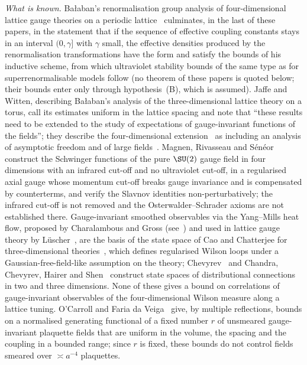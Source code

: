 \emph{What is known.} Ba{\l}aban's renormalisation group analysis of
four-dimensional lattice gauge theories on a periodic
lattice~\cite{Bal84a,Bal85a,Bal85c,Bal87,Bal88,Bal89b} culminates, in the
last of these papers, in the statement that if the sequence of effective
coupling constants stays in an interval $(0,\gamma]$ with $\gamma$ small,
the effective densities produced by the renormalisation transformations
have the form and satisfy the bounds of his inductive scheme, from which
ultraviolet stability bounds of the same type as for superrenormalisable
models follow (no theorem of these papers is quoted below; their bounds enter only
through hypothesis~(B), which is assumed). Jaffe and Witten, describing Ba{\l}aban's analysis of the
three-dimensional lattice theory on a torus, call its estimates uniform in
the lattice spacing and note that ``these results need to be extended to the
study of expectations of gauge-invariant functions of the fields''; they
describe the four-dimensional extension~\cite{Bal87} as including an
analysis of asymptotic freedom and of large fields~\cite{JW06}. Magnen, Rivasseau and
S\'en\'eor~\cite{MRS93} construct the Schwinger functions of the pure
$\SU(2)$ gauge field in four dimensions with an infrared cut-off and no
ultraviolet cut-off, in a regularised axial gauge whose momentum cut-off
breaks gauge invariance and is compensated by counterterms, and verify the
Slavnov identities non-perturbatively; the infrared cut-off is not removed and
the Osterwalder--Schrader axioms are not established there. Gauge-invariant
smoothed observables via the Yang--Mills heat flow, proposed by Charalambous
and Gross (see~\cite{CC24}) and used in lattice gauge theory by
L\"uscher~\cite{Lus10}, are the basis of the state space of Cao and
Chatterjee for three-dimensional theories~\cite{CC24,CC23}, which defines
regularised Wilson loops under a Gaussian-free-field-like assumption on the
theory; Chevyrev~\cite{Che19} and Chandra, Chevyrev, Hairer and
Shen~\cite{CCHS22,CCHS24} construct state spaces of distributional connections
in two and three dimensions. None of these gives a bound on correlations of
gauge-invariant observables of the four-dimensional Wilson measure along a
lattice tuning. O'Carroll and Faria da Veiga~\cite{OCFdV20} give, by multiple
reflections, bounds on a normalised generating functional of a fixed number
$r$ of unsmeared gauge-invariant plaquette fields that are uniform in the
volume, the spacing and the coupling in a bounded range; since $r$ is
fixed, these bounds do not control fields smeared over
$\asymp a^{-4}$ plaquettes.

